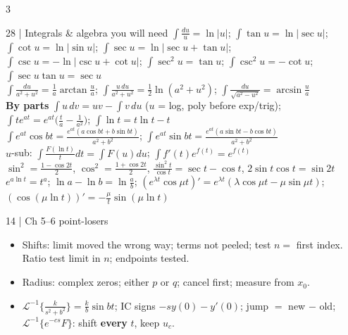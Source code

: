\documentclass[8pt]{extarticle}
\newcommand{\key}[1]{\textcolor{grn}{\textbf{#1}}}
\newcommand{\Li}{\mathcal{L}^{-1}}
\begin{document}
\begin{multicols*}{3}
\begin{card}{28 \;|\; Integrals \& algebra you will need}
$\int\frac{du}{u}=\ln|u|$; \;$\int\tan u=\ln|\sec u|$; \;$\int\cot u=\ln|\sin u|$; \;$\int\sec u=\ln|\sec u+\tan u|$; \;$\int\csc u=-\ln|\csc u+\cot u|$; \;$\int\sec^2u=\tan u$; \;$\int\csc^2u=-\cot u$; \;$\int\sec u\tan u=\sec u$\\
$\int\frac{du}{a^2+u^2}=\frac1a\arctan\frac ua$; \;$\int\frac{u\,du}{a^2+u^2}=\frac12\ln(a^2+u^2)$; \;$\int\frac{du}{\sqrt{a^2-u^2}}=\arcsin\frac ua$\\
\key{By parts} $\int u\,dv=uv-\int v\,du$ ($u$ = log, poly before exp/trig); \;$\int te^{at}=e^{at}\big(\frac ta-\frac1{a^2}\big)$; \;$\int\ln t=t\ln t-t$\\
$\int e^{at}\cos bt=\frac{e^{at}(a\cos bt+b\sin bt)}{a^2+b^2}$; \;$\int e^{at}\sin bt=\frac{e^{at}(a\sin bt-b\cos bt)}{a^2+b^2}$\\
$u$-sub: $\int\frac{F(\ln t)}{t}dt=\int F(u)du$; \;$\int f'(t)e^{f(t)}=e^{f(t)}$\\
$\sin^2=\frac{1-\cos2t}2$, $\cos^2=\frac{1+\cos2t}2$, $\frac{\sin^2t}{\cos t}=\sec t-\cos t$, $2\sin t\cos t=\sin2t$\\
$e^{a\ln t}=t^a$; \;$\ln a-\ln b=\ln\frac ab$; \;$(e^{\lambda t}\cos\mu t)'=e^{\lambda t}(\lambda\cos\mu t-\mu\sin\mu t)$; \;$(\cos(\mu\ln t))'=-\frac\mu t\sin(\mu\ln t)$
\end{card}

\begin{warn}{14 \;|\; Ch 5--6 point-losers}
\begin{itemize}
\item Shifts: limit moved the wrong way; terms not peeled; test $n=$ first index. Ratio test limit in $n$; endpoints tested.
\item Radius: complex zeros; either $p$ or $q$; cancel first; measure from $x_0$.
\item $\Li\{\frac k{s^2+b^2}\}=\frac kb\sin bt$; IC signs $-sy(0)-y'(0)$; jump $=$ new $-$ old; $\Li\{e^{-cs}F\}$: shift \textbf{every} $t$, keep $u_c$.
\end{itemize}
\end{warn}
\end{multicols*}
\end{document}
